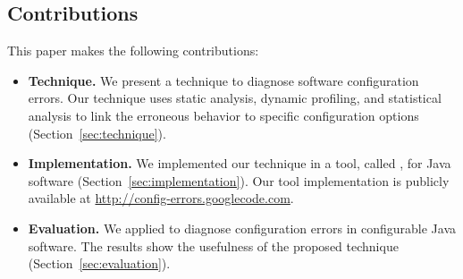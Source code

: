 
\subsection{Contributions}
This paper makes the following contributions:

\begin{itemize}

\item \textbf{Technique.} We present a technique to diagnose
software configuration errors. Our technique uses static analysis,
dynamic profiling, and statistical analysis to link the
erroneous behavior to specific configuration options (Section~\ref{sec:technique}).


\item \textbf{Implementation.} We implemented our technique 
in a tool, called \ourtool, for Java software (Section~\ref{sec:implementation}). Our tool implementation is publicly available at
\url{http://config-errors.googlecode.com}. 


\item \textbf{Evaluation.} We applied \ourtool to diagnose
\errors configuration errors in \subjectnum
configurable Java software. The results
show the usefulness of the proposed technique (Section~\ref{sec:evaluation}).

\end{itemize}



